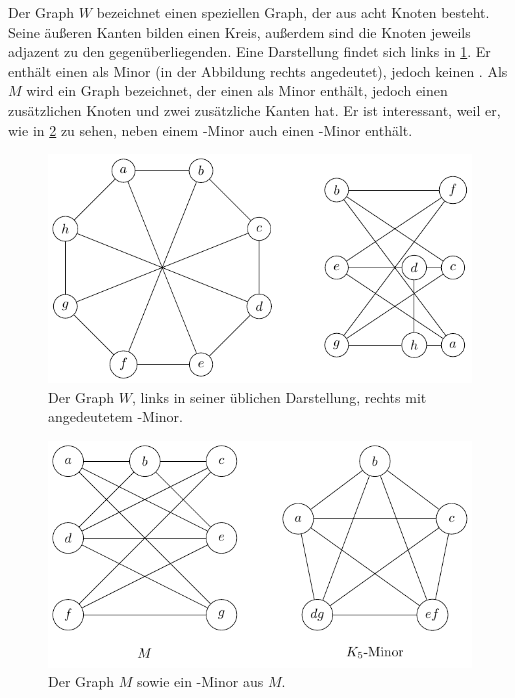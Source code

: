 Der Graph $W$ bezeichnet einen speziellen Graph, der aus acht Knoten besteht.
Seine äußeren Kanten bilden einen Kreis, außerdem sind die Knoten jeweils adjazent zu den gegenüberliegenden. Eine Darstellung findet sich links in \Abb \ref{fig:W}.
Er enthält einen \kdd als Minor (in der Abbildung rechts angedeutet), jedoch keinen \kf.
Als $M$ wird ein Graph bezeichnet, der einen \kdd als Minor enthält, jedoch einen zusätzlichen Knoten und zwei zusätzliche Kanten hat.
Er ist interessant, weil er, wie in \Abb \ref{fig:M} zu sehen, neben einem \kdd-Minor auch einen \kf-Minor enthält.
\begin{figure}[H]
  \centering
  \includegraphics[keepaspectratio]{bilder/W.pdf}
  \caption{Der Graph $W$, links in seiner üblichen Darstellung, rechts mit angedeutetem \kdd-Minor.}
  \label{fig:W}
\end{figure}

\begin{figure}[H]
  \centering
  \includegraphics[keepaspectratio]{bilder/M.pdf}
  \caption{Der Graph $M$ sowie ein \kf-Minor aus $M$.}
  \label{fig:M}
\end{figure}

